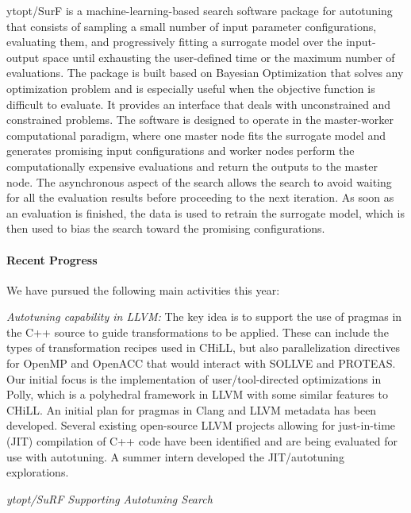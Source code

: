 ytopt/SurF is a machine-learning-based search software package for autotuning that consists of sampling a small number of input parameter configurations, evaluating them, and progressively fitting a surrogate model over the input-output space until exhausting the user-defined time or the maximum number of evaluations. The package is built based on Bayesian Optimization that solves any optimization problem and is especially useful when the objective function is difficult to evaluate. It provides an interface that deals with unconstrained and constrained problems. The software is designed to operate in the master-worker computational paradigm, where one master node fits the surrogate model and generates promising input configurations and worker nodes perform the computationally expensive evaluations and return the outputs to the master node. The asynchronous aspect of the search allows the search to avoid waiting for all the evaluation results before proceeding to the next iteration. As soon as an evaluation is finished, the data is used to retrain the surrogate model, which is then used to bias the search toward the promising configurations.


\paragraph{Recent Progress}


We have pursued the following main activities this year:

\textit{Autotuning capability in LLVM:}
The key idea is to support the use of pragmas in the C++ source to guide transformations to be applied. These can include the types of transformation recipes used in CHiLL, but also parallelization directives for OpenMP and OpenACC that would interact with SOLLVE and PROTEAS. Our initial focus is the implementation of user/tool-directed optimizations in Polly, which is a polyhedral framework in LLVM with some similar features to CHiLL. An initial plan for pragmas in Clang and LLVM metadata has been developed. Several existing open-source LLVM projects allowing for just-in-time (JIT) compilation of C++ code have been identified and are being evaluated for use with autotuning. A summer intern developed the JIT/autotuning explorations. 

\vspace*{.1in}
\noindent
\textit{ytopt/SuRF Supporting Autotuning Search}

